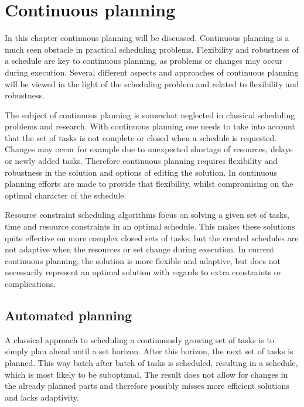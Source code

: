\documentclass{article}
\begin{document}
\newpage

\section{Continuous planning}

In this chapter continuous planning will be discussed.
Continuous planning is a much seen obstacle in practical scheduling problems.
Flexibility and robustness of a schedule are key to continuous planning, as problems or changes may occur during execution.
Several different aspects and approaches of continuous planning will be viewed in the light of the scheduling problem and related to flexibility and robustness.

The subject of continuous planning is somewhat neglected in classical scheduling problems and research.
With continuous planning one needs to take into account that the set of tasks is not complete or closed when a schedule is requested.
Changes may occur for example due to unexpected shortage of resources, delays or newly added tasks.
Therefore continuous planning requires flexibility and robustness in the solution and options of editing the solution.
In continuous planning efforts are made to provide that flexibility, whilst compromising on the optimal character of the schedule.

Resource constraint scheduling algorithms focus on solving a given set of tasks, time and resource constraints in an optimal schedule.
This makes these solutions quite effective on more complex closed sets of tasks, but the created schedules are not adaptive when the resources or set change during execution.
In current continuous planning, the solution is more flexible and adaptive, but does not necessarily represent an optimal solution with regards to extra constraints or complications.
\cite{laborie03}

\subsection{Automated planning}

A classical approach to scheduling a continuously growing set of tasks is to simply plan ahead until a set horizon.
After this horizon, the next set of tasks is planned.
This way batch after batch of tasks is scheduled, resulting in a schedule, which is most likely to be suboptimal.
The result does not allow for changes in the already planned parts and therefore possibly misses more efficient solutions and lacks adaptivity.
\cite{chien00}
\end{document}
